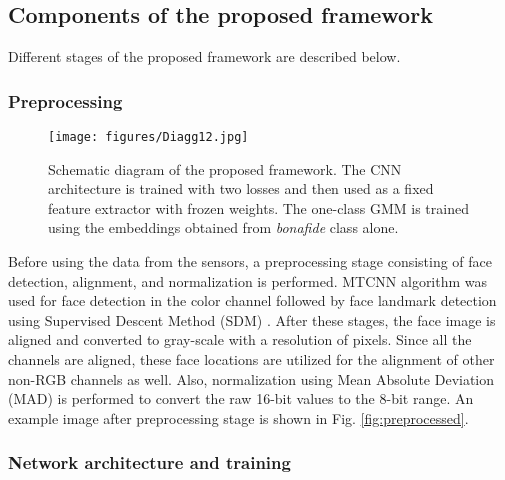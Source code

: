 \documentclass[journal]{IEEEtran}
\begin{document}
\subsection{ Components of the proposed framework}

Different stages of the proposed framework are described below.
\subsubsection{Preprocessing}

\begin{figure*}[t!]
     \centering
         \texttt{[image: figures/Diagg12.jpg]}

\caption{Schematic diagram of the proposed framework. The CNN architecture is trained with two losses and then used as a fixed feature extractor with frozen weights. The one-class GMM is trained using the embeddings obtained from \textit{bonafide} class alone. }
\label{fig:arch}
\end{figure*}

Before using the data from the sensors, a preprocessing stage consisting of face detection, alignment, and normalization is performed. MTCNN algorithm \cite{zhang2016joint} was used for face detection in the color channel followed by face landmark detection using Supervised Descent Method (SDM) \cite{xiong2013supervised}. After these stages, the face image is aligned and converted to gray-scale with a resolution of  pixels. Since all the channels are aligned, these face locations are utilized for the alignment of other non-RGB channels as well. Also, normalization using  Mean Absolute Deviation (MAD) \cite{leys2013detecting} is performed to convert the raw 16-bit values to the 8-bit range. An example image after preprocessing stage is shown in Fig. \ref{fig:preprocessed}.
\subsubsection{Network architecture and training}
\end{document}
